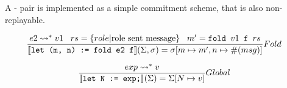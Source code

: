 \documentclass[acmsmall,review,anonymous]{acmart}\settopmatter{printfolios=true}
\begin{document}
A - pair is implemented as a simple commitment scheme, that is also non-replayable.

\begin{align*}
	\judge{&Fold}{
		e2 \leadsto^* v1 \;\;\; rs = \{ role | \text{role sent message} \} \;\;\; m' = \texttt{fold } v1 \texttt{ f } rs
	}{
		\semfunc[let (m, n) := fold e2 f](\Sigma, \sigma) = \sigma [m \mapsto m', n \mapsto \#(msg) ]
	}
\end{align*}


\begin{align*}
	\judge{&Global}{
		exp \leadsto^* v
	}{
		\semfunc[let N := exp;](\Sigma) = \Sigma [N \mapsto v]
	}
\end{align*}







\newpage

%



\newpage


% 

%
\end{document}
